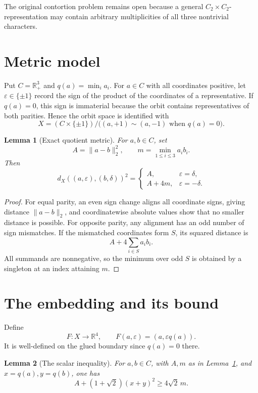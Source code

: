 \documentclass[11pt]{article}
\newtheorem{lemma}{Lemma}
\newcommand{\R}{\mathbb R}
\newcommand{\Vfour}{C_2\times C_2}
\begin{document}
The original contortion problem remains open because a general
$\Vfour$-representation may contain arbitrary multiplicities of all three
nontrivial characters.

\section{Metric model}

Put $C=\R_+^3$ and $q(a)=\min_i a_i$. For $a\in C$ with all coordinates
positive, let $\varepsilon\in\{\pm1\}$ record the sign of the product of the
coordinates of a representative. If $q(a)=0$, this sign is immaterial because
the orbit contains representatives of both parities. Hence the orbit space is
identified with
\[
 X=(C\times\{\pm1\})/\big((a,+1)\sim(a,-1)\text{ when }q(a)=0\big).
\]

\begin{lemma}[Exact quotient metric]\label{lem:metric}
For $a,b\in C$, set
\[
 A=\|a-b\|_2^2,\qquad m=\min_{1\leq i\leq3}a_i b_i.
\]
Then
\[
d_X((a,\varepsilon),(b,\delta))^2=
\begin{cases}
A,&\varepsilon=\delta,\\
A+4m,&\varepsilon=-\delta.
\end{cases}
\]
\end{lemma}

\begin{proof}
For equal parity, an even sign change aligns all coordinate signs, giving
distance $\|a-b\|_2$, and coordinatewise absolute values show that no smaller
distance is possible. For opposite parity, any alignment has an odd number of
sign mismatches. If the mismatched coordinates form $S$, its squared distance
is
\[
A+4\sum_{i\in S}a_i b_i.
\]
All summands are nonnegative, so the minimum over odd $S$ is obtained by a
singleton at an index attaining $m$.
\end{proof}

\section{The embedding and its bound}

Define
\[
 F:X\longrightarrow\R^4,\qquad F(a,\varepsilon)=(a,\varepsilon q(a)).
\]
It is well-defined on the glued boundary since $q(a)=0$ there.

\begin{lemma}[The scalar inequality]\label{lem:scalar}
For $a,b\in C$, with $A,m$ as in Lemma~\ref{lem:metric}, and
$x=q(a),y=q(b)$, one has
\[
 A+(1+\sqrt2)(x+y)^2\geq4\sqrt2\,m.
\]
\end{lemma}
\end{document}
